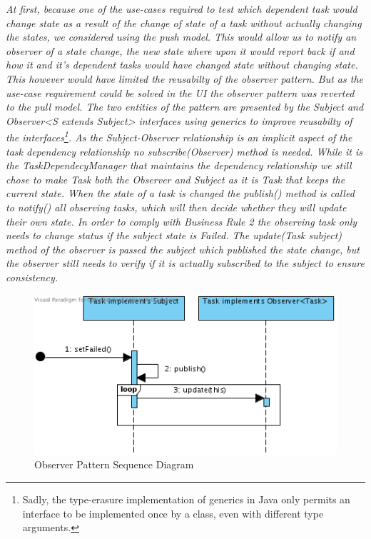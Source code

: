 				\emph{At first, because one of the use-cases required to test which dependent task would change state as a result of the change of state of a task without actually changing the states, we considered using the push model. This would allow us to notify an observer of a state change, the new state where upon it would report back if and how it and it's dependent tasks would have changed state without changing state. This however would have limited the reusabilty of the observer pattern. But as the use-case requirement could be solved in the UI the observer pattern was reverted to the pull model. The two entities of the pattern are presented by the Subject and Observer<S extends Subject> interfaces using generics to improve reusabilty of the interfaces\footnote{Sadly, the type-erasure implementation of generics in Java only permits an interface to be implemented once by a class, even with different type arguments.}. As the Subject-Observer relationship is an implicit aspect of the task dependency relationship no subscribe(Observer) method is needed. While it is the TaskDependecyManager that maintains the dependency relationship we still chose to make Task both the Observer and Subject as it is Task that keeps the current state. When the state of a task is changed the publish() method is called to notify() all observing tasks, which will then decide whether they will update their own state. In order to comply with Business Rule 2 the observing task only needs to change status if the subject state is Failed. The update(Task subject) method of the observer is passed the subject which published the state change, but the observer still needs to verify if it is actually subscribed to the subject to ensure consistency.}

				\begin{figure}[H]
					\begin{center}
						\includegraphics[scale=0.7]{images/Observer_Pattern.png}
					\end{center}
					\caption{Observer Pattern Sequence Diagram}
				\end{figure}
				

